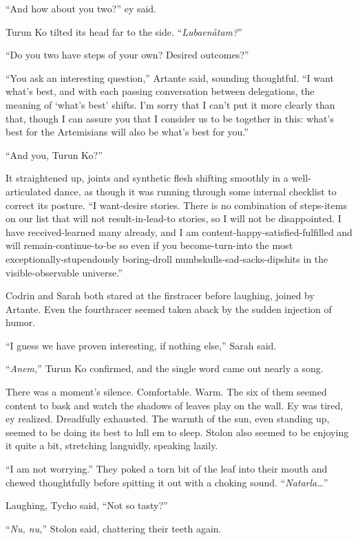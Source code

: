 ``And how about you two?'' ey said.

Turun Ko tilted its head far to the side. ``\emph{Lubaenåtam?}''

``Do you two have steps of your own? Desired outcomes?''

``You ask an interesting question,'' Artante said, sounding thoughtful. ``I want what's best, and with each passing conversation between delegations, the meaning of `what's best' shifts. I'm sorry that I can't put it more clearly than that, though I can assure you that I consider us to be together in this: what's best for the Artemisians will also be what's best for you.''

``And you, Turun Ko?''

It straightened up, joints and synthetic flesh shifting smoothly in a well-articulated dance, as though it was running through some internal checklist to correct its posture. ``I want-desire stories. There is no combination of steps-items on our list that will not result-in-lead-to stories, so I will not be disappointed. I have received-learned many already, and I am content-happy-satisfied-fulfilled and will remain-continue-to-be so even if you become-turn-into the most exceptionally-stupendously boring-droll numbskulls-sad-sacks-dipshits in the visible-observable universe.''

Codrin and Sarah both stared at the firstracer before laughing, joined by Artante. Even the fourthracer seemed taken aback by the sudden injection of humor.

``I guess we have proven interesting, if nothing else,'' Sarah said.

``\emph{Anem,}'' Turun Ko confirmed, and the single word came out nearly a song.

There was a moment's silence. Comfortable. Warm. The six of them seemed content to bask and watch the shadows of leaves play on the wall. Ey was tired, ey realized. Dreadfully exhausted. The warmth of the sun, even standing up, seemed to be doing its best to lull em to sleep. Stolon also seemed to be enjoying it quite a bit, stretching languidly, speaking lazily.

``I am not worrying.'' They poked a torn bit of the leaf into their mouth and chewed thoughtfully before spitting it out with a choking sound. ``\emph{Natarla\ldots{}}''

Laughing, Tycho said, ``Not so tasty?''

``\emph{Nu, nu,}'' Stolon said, chattering their teeth again.

